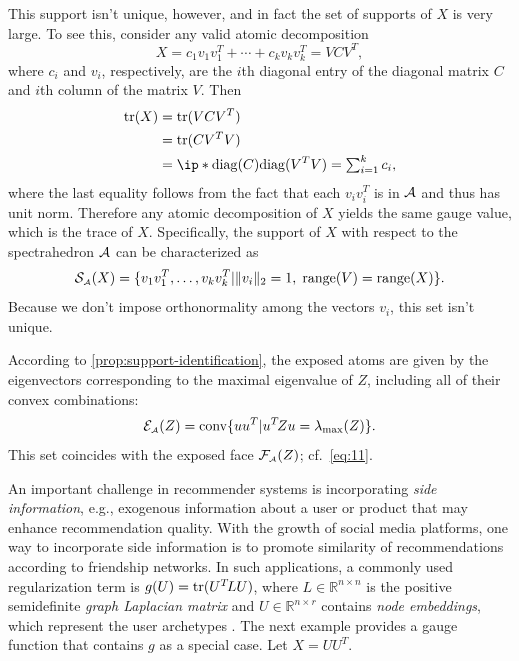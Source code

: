 \begin{example}
  This support isn't unique, however, and in fact the set of supports
  of $X$ is very large.  To see this, consider any valid atomic
  decomposition
  \[
    X = c_1v_1v_1^T + \cdots + c_kv_kv_k^T = VCV^T,
  \]
  where $c_i$ and $v_i$, respectively, are the $i$th diagonal entry of
  the diagonal matrix $C$ and $i$th column of the matrix $V$. Then
  \begin{align*}
    \trace(X) &= \trace(VCV^T)
   \\         &= \trace(CV^TV)
   \\         &= \ip*{\diag(C)}{\diag(V^TV)} = \textstyle\sum_{i=1}^kc_i,
  \end{align*}
  where the last equality follows from the fact that each $v_i v_i^T$
  is in $\mathcal{A}$ and thus has unit norm.  Therefore any atomic
  decomposition of $X$ yields the same gauge value, which is the trace
  of $X$. Specifically, the support of $X$ with respect to the
  spectrahedron $\mathcal{A}$ can be characterized as
  \begin{equation*}
    \mathcal{S}_{\scriptscriptstyle\mathcal{A}}(X) =
    \{v_1v_1^T,\ldots,v_kv_k^T | \|v_i\|_2 = 1, \;
      \operatorname{range}(V) = \operatorname{range}(X)\}.
  \end{equation*}
  Because we don't impose orthonormality among the vectors $v_i$,
  this set isn't unique.

  According to \autoref{prop:support-identification}, the exposed atoms are given by the
  eigenvectors corresponding to the maximal eigenvalue of $Z$,
  including all of their convex combinations:
  \[
    \mathcal{E}_{\scriptscriptstyle\mathcal{A}}(Z) =
    \operatorname{conv}\{uu^T | u^T\! Zu = \lambda_{\max}(Z)\}.
  \]
  This set coincides with the exposed face $\mathcal{F}_{\scriptscriptstyle\mathcal{A}}(Z)$; cf.~\eqref{eq:11}.
\end{example}

An important challenge in recommender systems is incorporating \emph{side
  information}, e.g., exogenous information about a user or product that may
  enhance recommendation quality. With the growth of social media platforms, one
  way to incorporate side information is to promote similarity of
  recommendations according to friendship networks. In such applications, a
  commonly used regularization term is $g(U) = \operatorname{tr}(U^T\! LU)$, where $L\in
  \mathbb R^{n\times n}$ is the positive semidefinite \emph{graph Laplacian
  matrix} and $U\in \mathbb R^{n\times r}$ contains \emph{node embeddings},
  which represent the user archetypes
  \cite{rao2015collaborative,belkin2002laplacian,belkin2003laplacian}. The next
  example provides a gauge function that contains $g$ as a special case. Let $X
  = UU^T$. 

